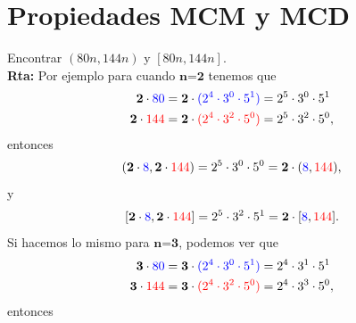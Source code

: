 \section{Propiedades MCM y MCD}\label{section_propiedades_MCM_MCD}

\begin{ejemplo}\label{Ejemplo_aopsTN_4_20}
	Encontrar $(80n,144n)$ y $[80n,144n]$. \\
\textbf{Rta:} Por ejemplo para cuando $\textbf{n=2}$ tenemos que 
	\begin{equation*}
			\begin{split}
					\textbf{2}\cdot \color{blue} 80 \color{black} &= \textbf{2}\cdot\color{blue}(2^4\cdot3^0\cdot 5^1 )\color{black}=2^5\cdot 3^0\cdot 5^1 \\
					\textbf{2}\cdot \color{red} 144 \color{black}& =\textbf{2}\cdot\color{red}(2^4\cdot3^2\cdot 5^0 )\color{black} =2^5\cdot3^2\cdot 5^0,
			\end{split}
	\end{equation*}
entonces 
	\begin{equation*}
			\begin{split}
					(\textbf{2}\cdot \color{blue} 8\color{black},\textbf{2}\cdot \color{red} 144 \color{black})= 2^5\cdot3^0\cdot 5^0=\textbf{2}\cdot(\color{blue} 8\color{black}, \color{red} 144 \color{black}),
			\end{split}
	\end{equation*}
y
	\begin{equation*}
		\begin{split}
		[\textbf{2}\cdot \color{blue} 8\color{black},\textbf{2}\cdot \color{red} 144 \color{black}]= 2^5\cdot3^2\cdot 5^1=\textbf{2}\cdot[\color{blue} 8\color{black}, \color{red} 144 \color{black}].
		\end{split}
	\end{equation*}
Si hacemos lo mismo para $\textbf{n=3}$, podemos ver que 
	\begin{equation*}
	\begin{split}
	\textbf{3}\cdot \color{blue} 80 \color{black} &= \textbf{3}\cdot\color{blue}(2^4\cdot3^0\cdot 5^1 )\color{black}=2^4\cdot 3^1\cdot 5^1 \\
	\textbf{3}\cdot \color{red} 144 \color{black}& =\textbf{3}\cdot\color{red}(2^4\cdot3^2\cdot 5^0 )\color{black} =2^4\cdot3^3\cdot 5^0,
	\end{split}
	\end{equation*}
	entonces 
	\begin{equation*}
	\begin{split}

\end{split}
\end{equation*}
\end{ejemplo}
